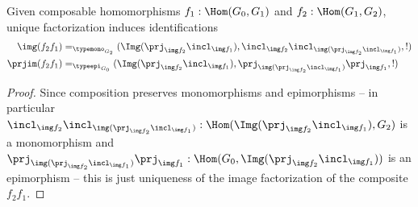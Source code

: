 \begin{lemma}
  Given composable homomorphisms $f_1:\Hom(G_0,G_1)$ and $f_2:\Hom(G_1,G_2)$, unique factorization induces identifications
  \begin{align*}
    \img(f_2f_1)&=_{\typemono_{G_2}}(\Img(\prj_{\img f_2}\incl_{\img f_1}),\incl_{\img f_2}\incl_{\img(\prj_{\img f_2}\incl_{\img f_1})},!)\\
    \prjim(f_2f_1)&=_{\typeepi_{G_0}}(\Img(\prj_{\img f_2}\incl_{\img f_1}),
  \prj_{\img(\prj_{\img f_2}\incl_{\img f_1})}\prj_{\img f_1},!)\\%
  \end{align*}
  
  
\end{lemma}
\begin{proof}
  Since composition preserves monomorphisms and epimorphisms
  -- in particular
  $\incl_{\img f_2} \incl_{\img(\prj_{\img f_2}\incl_{\img f_1})}:\Hom(\Img(\prj_{\img f_2}\incl_{\img f_1}),G_2)$ is a monomorphism and
  $\prj_{\img(\prj_{\img f_2}\incl_{\img f_1})} \prj_{\img f_1}:\Hom(G_0,\Img(\prj_{\img f_2}\incl_{\img f_1}))$ is an epimorphism --
  this is just uniqueness of the image factorization of the composite $f_2f_1$.
\end{proof}

